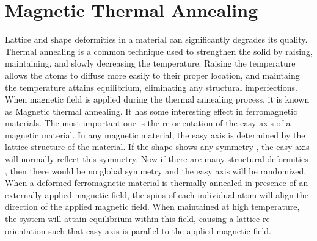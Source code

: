 \section{Magnetic Thermal Annealing}
Lattice and shape deformities in a material can significantly degrades its quality. Thermal annealing is a common technique used to strengthen the solid by raising, maintaining, and slowly decreasing the temperature. Raising the temperature allows the atoms to diffuse more easily to their proper location, and maintaing the temperature attains equilibrium, eliminating any structural imperfections.\\
When magnetic field is applied during the thermal annealing process, it is known as Magnetic thermal annealing. It has some interesting effect in ferromagnetic materials. The most important one is the re-orientation of the easy axis of a magnetic material. In any magnetic material, the easy axis is determined by the lattice structure of the material. If the shape shows any symmetry , the easy axis will normally reflect this symmetry. Now if there are many structural deformities , then there would be no global symmetry and the easy axis will be randomized.\\
When a deformed ferromagnetic material is thermally annealed in presence of an externally applied magnetic field, the spins of each individual atom will align the direction of the applied magnetic field. When maintained at high temperature, the system will attain equilibrium within this field, causing a lattice re-orientation such that easy axis is parallel to the applied magnetic field.
